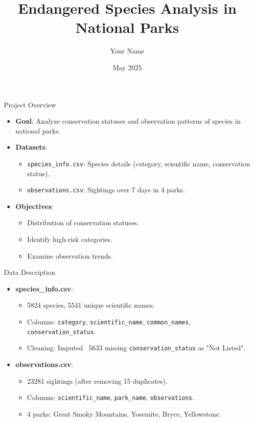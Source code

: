 \documentclass{beamer}
\title{Endangered Species Analysis in National Parks}
\author{Your Name}
\date{May 2025}
\begin{document}
\begin{frame}
    \titlepage
\end{frame}

\begin{frame}{Project Overview}
    \begin{itemize}
        \item \textbf{Goal}: Analyze conservation statuses and observation patterns of species in national parks.
        \item \textbf{Datasets}:
        \begin{itemize}
            \item \texttt{species\_info.csv}: Species details (category, scientific name, conservation status).
            \item \texttt{observations.csv}: Sightings over 7 days in 4 parks.
        \end{itemize}
        \item \textbf{Objectives}:
        \begin{itemize}
            \item Distribution of conservation statuses.
            \item Identify high-risk categories.
            \item Examine observation trends.
        \end{itemize}
    \end{itemize}
\end{frame}

\begin{frame}{Data Description}
    \begin{itemize}
        \item \textbf{species\_info.csv}:
        \begin{itemize}
            \item 5824 species, 5541 unique scientific names.
            \item Columns: \texttt{category}, \texttt{scientific\_name}, \texttt{common\_names}, \texttt{conservation\_status}.
            \item Cleaning: Imputed ~5633 missing \texttt{conservation\_status} as "Not Listed".
        \end{itemize}
        \item \textbf{observations.csv}:
        \begin{itemize}
            \item 23281 sightings (after removing 15 duplicates).
            \item Columns: \texttt{scientific\_name}, \texttt{park\_name}, \texttt{observations}.
            \item 4 parks: Great Smoky Mountains, Yosemite, Bryce, Yellowstone.
        \end{itemize}
    \end{itemize}
\end{frame}
\end{document}
